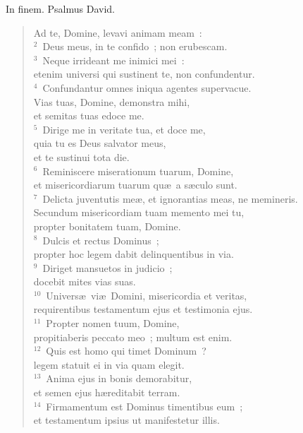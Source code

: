 \lettrine[lines=3,image=true,loversize=0.05,lraise=-0.03]{I}{}n finem. Psalmus David. \begin{flushleft}\begin{verse}\vspace{6pt}Ad te, Domine, levavi animam meam~:\\
${}^{2}$~Deus meus, in te confido~; non erubescam.\\
${}^{3}$~Neque irrideant me inimici mei~:\\ etenim universi qui sustinent te, non confundentur.\\
${}^{4}$~Confundantur omnes iniqua agentes supervacue.\\ Vias tuas, Domine, demonstra mihi,\\ et semitas tuas edoce me.\\
${}^{5}$~Dirige me in veritate tua, et doce me,\\ quia tu es Deus salvator meus,\\ et te sustinui tota die.\\
${}^{6}$~Reminiscere miserationum tuarum, Domine,\\ et misericordiarum tuarum qu\ae\ a s\ae culo sunt.\\
${}^{7}$~Delicta juventutis me\ae , et ignorantias meas, ne memineris.\\ Secundum misericordiam tuam memento mei tu,\\ propter bonitatem tuam, Domine.\\
${}^{8}$~Dulcis et rectus Dominus~;\\ propter hoc legem dabit delinquentibus in via.\\
${}^{9}$~Diriget mansuetos in judicio~;\\ docebit mites vias suas.\\
${}^{10}$~Univers\ae\ vi\ae\ Domini, misericordia et veritas,\\ requirentibus testamentum ejus et testimonia ejus.\\
${}^{11}$~Propter nomen tuum, Domine,\\ propitiaberis peccato meo~; multum est enim.\\
${}^{12}$~Quis est homo qui timet Dominum~?\\ legem statuit ei in via quam elegit.\\
${}^{13}$~Anima ejus in bonis demorabitur,\\ et semen ejus h\ae reditabit terram.\\
${}^{14}$~Firmamentum est Dominus timentibus eum~;\\ et testamentum ipsius ut manifestetur illis.\\

\end{verse}
\end{flushleft}
